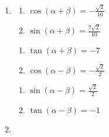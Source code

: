 \documentclass{ximera}
\begin{document}
\begin{enumerate}

\setcounter{enumi}{\value{HW}}

\item \begin{multicols}{2}

\begin{enumerate}

\item  $\cos(\alpha + \beta) = -\frac{\sqrt{2}}{10}$
\item  $\sin(\alpha + \beta) = \frac{7\sqrt{2}}{10}$

\setcounter{HWindent}{\value{enumii}}

\end{enumerate}

\end{multicols}

\begin{multicols}{2}

\begin{enumerate}

\setcounter{enumii}{\value{HWindent}}

\item  $\tan(\alpha + \beta) = -7$ 
\item  $\cos(\alpha - \beta)= -\frac{\sqrt{2}}{2}$

\setcounter{HWindent}{\value{enumii}}

\end{enumerate}

\end{multicols}

\begin{multicols}{2}

\begin{enumerate}

\setcounter{enumii}{\value{HWindent}}

\item  $\sin(\alpha - \beta) = \frac{\sqrt{2}}{2}$
\item  $\tan(\alpha - \beta) = -1$ 

\end{enumerate}

\end{multicols}

\item \begin{multicols}{2}

\begin{enumerate}


\end{enumerate}
\end{multicols}
\end{enumerate}
\end{document}
